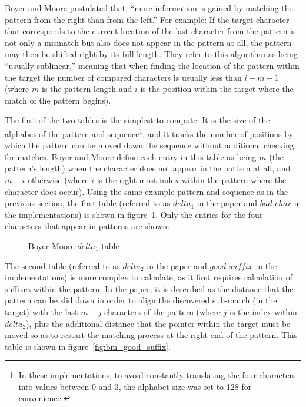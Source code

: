 Boyer and Moore postulated that, ``more information is gained by matching the pattern from the right than from the left.'' For example: If the target character that corresponds to the current location of the last character from the pattern is not only a mismatch but also does not appear in the pattern at all, the pattern may then be shifted right by its full length. They refer to this algorithm as being ``usually sublinear,'' meaning that when finding the location of the pattern within the target the number of compared characters is usually less than $i+m-1$ (where $m$ is the pattern length and $i$ is the position within the target where the match of the pattern begins).

The first of the two tables is the simplest to compute. It is the size of the alphabet of the pattern and sequence\footnote{In these implementations, to avoid constantly translating the four characters into values between 0 and 3, the alphabet-size was set to 128 for convenience.}, and it tracks the number of positions by which the pattern can be moved down the sequence without additional checking for matches. Boyer and Moore define each entry in this table as being $m$ (the pattern's length) when the character does not appear in the pattern at all, and $m - i$ otherwise (where $i$ is the right-most index within the pattern where the character does occur). Using the same example pattern and sequence as in the previous section, the first table (referred to as $delta_1$ in the paper and $bad\_char$ in the implementations) is shown in figure~\ref{fig:bm_bad_char}. Only the entries for the four characters that appear in patterns are shown.

\begin{figure}[ht]
\centering

\caption{Boyer-Moore $delta_1$ table}
\label{fig:bm_bad_char}
\end{figure}

The second table (referred to as $delta_2$ in the paper and $good\_suffix$ in the implementations) is more complex to calculate, as it first requires calculation of suffixes within the pattern. In the paper, it is described as the distance that the pattern can be slid down in order to align the discovered sub-match (in the target) with the last $m - j$ characters of the pattern (where $j$ is the index within $delta_2$), plus the additional distance that the pointer within the target must be moved so as to restart the matching process at the right end of the pattern. This table is shown in figure~\ref{fig:bm_good_suffix}.

